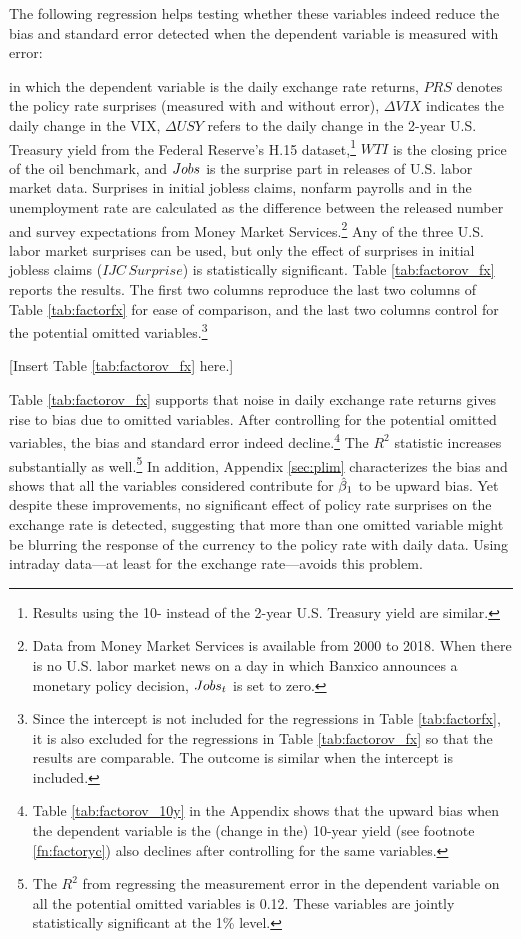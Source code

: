 The following regression helps testing whether these variables indeed reduce the bias and standard error detected when the dependent variable is measured with error: 

in which the dependent variable is the daily exchange rate returns, \(PRS\) denotes the policy rate surprises (measured with and without error), \(\Delta VIX\) indicates the daily change in the VIX, \(\Delta USY\) refers to the daily change in the 2-year U.S. Treasury yield from the Federal Reserve's H.15 dataset,\footnote{Results using the 10- instead of the 2-year U.S. Treasury yield are similar.} \(WTI\) is the closing price of the oil benchmark, and \(Jobs\) is the surprise part in releases of U.S. labor market data. Surprises in initial jobless claims, nonfarm payrolls and in the unemployment rate are calculated as the difference between the released number and survey expectations from Money Market Services.\footnote{Data from Money Market Services is available from 2000 to 2018. When there is no U.S. labor market news on a day in which Banxico announces a monetary policy decision, \(Jobs_{t}\) is set to zero.} Any of the three U.S. labor market surprises can be used, but only the effect of surprises in initial jobless claims (\(IJC \, Surprise\)) is statistically significant. Table \ref{tab:factorov_fx} reports the results. 
The first two columns reproduce the last two columns of Table \ref{tab:factorfx} for ease of comparison, and the last two columns control for the potential omitted variables.\footnote{Since the intercept is not included for the regressions in Table \ref{tab:factorfx}, it is also excluded for the regressions in Table \ref{tab:factorov_fx} so that the results are comparable. The outcome is similar when the intercept is included.}
\begin{center}
	[Insert Table \ref{tab:factorov_fx} here.]
\end{center}

Table \ref{tab:factorov_fx} supports that noise in daily exchange rate returns gives rise to bias due to omitted variables. After controlling for the potential omitted variables, the bias and standard error indeed decline.\footnote{Table \ref{tab:factorov_10y} in the Appendix shows that the upward bias when the dependent variable is the (change in the) 10-year yield (see footnote \ref{fn:factoryc}) also declines after controlling for the same variables.} The \(R^2\) statistic increases substantially as well.\footnote{The \(R^2\) from regressing the measurement error in the dependent variable on all the potential omitted variables is 0.12. These variables are jointly statistically significant at the 1\% level.} In addition, Appendix \ref{sec:plim} characterizes the bias and shows that all the variables considered contribute for \(\hat{\beta}_{1}\) to be upward bias. Yet despite these improvements, no significant effect of policy rate surprises on the exchange rate is detected, suggesting that more than one omitted variable might be blurring the response of the currency to the policy rate with daily data. Using intraday data---at least for the exchange rate---avoids this problem.

